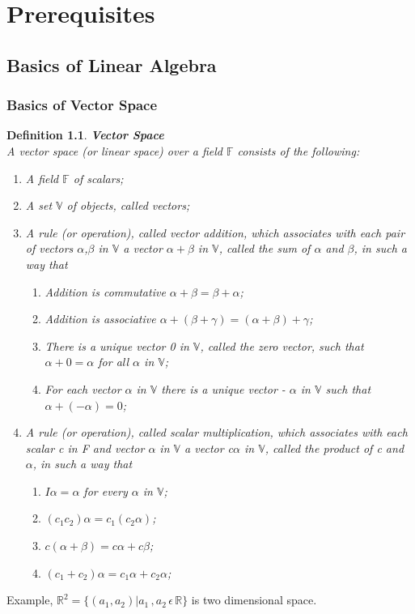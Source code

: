 \documentclass[12pt]{report}
\def\F{{\mathbb F}}
\def\R{{\mathbb R}}
\def\V{{ \mathbb V}}
\begin{document}
\chapter{Prerequisites}
\section{Basics of Linear Algebra}
\subsection{Basics of Vector Space}
\newtheorem{thm}{Theorem}[chapter]

\newtheorem{defn}[thm]{Definition}
\begin{defn}
\textbf{Vector Space} \\ 
A vector space (or linear space) over a field $\F$ consists of the following: 
\begin{enumerate}
	\item A field $\F$ of scalars;
	\item A set $\V$ of objects, called vectors;
	\item A rule (or operation), called vector addition, which associates with each pair of vectors $\alpha$,$\beta$ in  $\V$ a vector $\alpha+\beta$ in  $\V$, called the sum of $\alpha$ and $\beta$, in such a way that
	\begin{enumerate}
	\item Addition is commutative $\alpha+\beta = \beta+ \alpha$;
	\item Addition is associative $\alpha+(\beta+\gamma)=(\alpha+\beta)+\gamma$; 
	\item There is a unique vector 0 in  $\V$, called the zero vector, such that $\alpha+0=\alpha$ for all $\alpha$ in  $\V$;
	\item For each vector $\alpha$ in $\V$ there is a unique vector - $\alpha$ in  $\V$ such that $\alpha+(-\alpha)=0$;
	\end{enumerate}
	\item A rule (or operation), called scalar multiplication, which associates with each scalar c in F and vector $\alpha$ in  $\V$ a vector c$\alpha$ in  $\V$, called the product of c and $\alpha$, in such a way that
	\begin{enumerate}
	\item $I\alpha = \alpha$ for every $\alpha$ in  $\V$;
	\item $(c_1c_2)\alpha = c_1(c_2\alpha)$;
	\item $c(\alpha+\beta)= c\alpha+c\beta$;
	\item $(c_1+c_2)\alpha = c_1\alpha + c_2\alpha$;
	\end{enumerate}
\end{enumerate}
\end{defn}
Example, $\R^2 = \{(a_1, a_2) | a_1\,, a_2\, \epsilon \,\R\}$ is two dimensional space.
\end{document}
